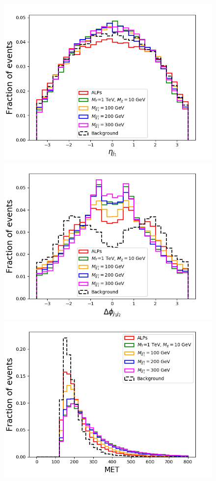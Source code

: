 \documentclass[prd,aps,letterpaper,floatfix,superscriptaddress,preprintnumbers,twocolumn,10pt,nofootinbib]{revtex4-1}
\begin{document}
\begin{figure}[t!]
\includegraphics[scale=0.4]{figures/etaj2allsbdelphesdijet.png}\\
\includegraphics[scale=0.4]{figures/deltaphij1j2allsbdelphesdijet.png}
\includegraphics[scale=0.4]{figures/METallsbdelphesdijet.png}\\

\end{figure}
\end{document}
